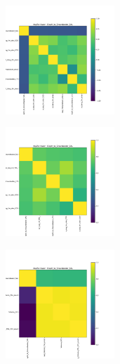 \documentclass{article}
\begin{document}
\begin{figure}
     \centering
     \begin{subfigure}
         \centering
         \includegraphics[width=0.45\textwidth]{figs/corr_Aquifer_Auser_Depth_to_Groundwater_SAL_pearson.pdf}
     \end{subfigure}
% 
     \begin{subfigure}
         \centering
         \includegraphics[width=0.45\textwidth]{figs/corr_Aquifer_Auser_Depth_to_Groundwater_SAL_phik.pdf}
     \end{subfigure}
%
     \begin{subfigure}
         \centering
         \includegraphics[width=0.45\textwidth]{figs/corr_Aquifer_Auser_Depth_to_Groundwater_SAL_pps.pdf}
     \end{subfigure}

\end{figure}
\end{document}
